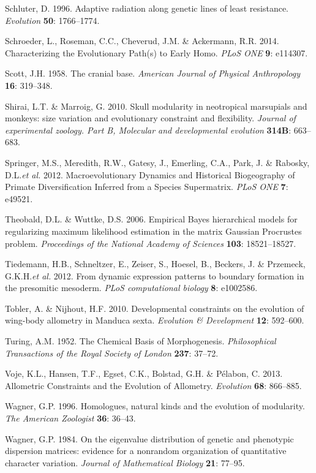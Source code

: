 \documentclass[12pt,twoside]{report}
\begin{document}
Schluter, D. 1996. Adaptive radiation along genetic lines of least
resistance. \emph{Evolution} \textbf{50}: 1766--1774.

Schroeder, L., Roseman, C.C., Cheverud, J.M. \& Ackermann, R.R. 2014.
Characterizing the Evolutionary Path(s) to Early Homo. \emph{PLoS ONE}
\textbf{9}: e114307.

Scott, J.H. 1958. The cranial base. \emph{American Journal of Physical
Anthropology} \textbf{16}: 319--348.

Shirai, L.T. \& Marroig, G. 2010. Skull modularity in neotropical
marsupials and monkeys: size variation and evolutionary constraint and
flexibility. \emph{Journal of experimental zoology. Part B, Molecular
and developmental evolution} \textbf{314B}: 663--683.

Springer, M.S., Meredith, R.W., Gatesy, J., Emerling, C.A., Park, J. \&
Rabosky, D.L.\emph{et al.} 2012. Macroevolutionary Dynamics and
Historical Biogeography of Primate Diversification Inferred from a
Species Supermatrix. \emph{PLoS ONE} \textbf{7}: e49521.

Theobald, D.L. \& Wuttke, D.S. 2006. Empirical Bayes hierarchical models
for regularizing maximum likelihood estimation in the matrix Gaussian
Procrustes problem. \emph{Proceedings of the National Academy of
Sciences} \textbf{103}: 18521--18527.

Tiedemann, H.B., Schneltzer, E., Zeiser, S., Hoesel, B., Beckers, J. \&
Przemeck, G.K.H.\emph{et al.} 2012. From dynamic expression patterns to
boundary formation in the presomitic mesoderm. \emph{PLoS computational
biology} \textbf{8}: e1002586.

Tobler, A. \& Nijhout, H.F. 2010. Developmental constraints on the
evolution of wing-body allometry in Manduca sexta. \emph{Evolution \&
Development} \textbf{12}: 592--600.

Turing, A.M. 1952. The Chemical Basis of Morphogenesis.
\emph{Philosophical Transactions of the Royal Society of London}
\textbf{237}: 37--72.

Voje, K.L., Hansen, T.F., Egset, C.K., Bolstad, G.H. \& Pélabon, C.
2013. Allometric Constraints and the Evolution of Allometry.
\emph{Evolution} \textbf{68}: 866--885.

Wagner, G.P. 1996. Homologues, natural kinds and the evolution of
modularity. \emph{The American Zoologist} \textbf{36}: 36--43.

Wagner, G.P. 1984. On the eigenvalue distribution of genetic and
phenotypic dispersion matrices: evidence for a nonrandom organization of
quantitative character variation. \emph{Journal of Mathematical Biology}
\textbf{21}: 77--95.
\end{document}
